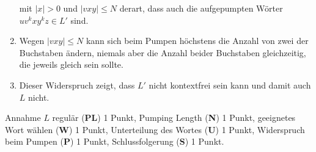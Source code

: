 \begin{loesung}
\begin{enumerate}
\begin{center}
\end{center}
mit $|x|>0$ und $|vxy|\le N$ derart,
dass auch die aufgepumpten Wörter $uv^kxy^kz\in L'$ sind.
\item
Wegen $|vxy|\le N$ kann sich beim Pumpen höchstens die Anzahl von
zwei der Buchstaben ändern, niemals aber die Anzahl beider Buchstaben
gleichzeitig, die jeweils gleich sein sollte.
\item
Dieser Widerspruch zeigt, dass $L'$ nicht kontextfrei sein kann
und damit auch $L$ nicht.
\qedhere

\end{enumerate}
\end{loesung}

\begin{bewertung}
Annahme $L$ regulär ({\bf PL}) 1 Punkt,
Pumping Length ({\bf N}) 1 Punkt,
geeignetes Wort wählen ({\bf W}) 1 Punkt,
Unterteilung des Wortes ({\bf U}) 1 Punkt,
Widerspruch beim Pumpen ({\bf P}) 1 Punkt,
Schlussfolgerung ({\bf S}) 1 Punkt.
\end{bewertung}

